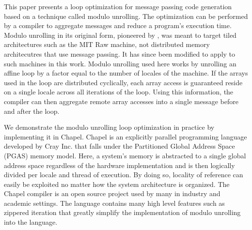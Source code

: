 This paper presents a loop optimization for message passing code generation based on a technique called modulo unrolling. The optimization can be performed by a compiler to aggregate messages and reduce a program's execution time. Modulo unrolling in its original form, pioneered by \cite{barua1999maps}, was meant to target tiled architectures such as the MIT Raw machine, not distributed memory architecutres that use message passing. It has since been modified to apply to such machines in this work. Modulo unrolling used here works by unrolling an affine loop by a factor equal to the number of locales of the machine. If the arrays used in the loop are distributed cyclically, each array access is guaranteed reside on a single locale across all iterations of the loop. Using this information, the compiler can then aggregate remote array accesses into a single message before and after the loop. 

We demonstrate the modulo unrolling loop optimization in practice by implementing it in Chapel. Chapel is an explicitly parallel programming language developed by Cray Inc. that falls under the Partitioned Global Address Space (PGAS) memory model. Here, a system's memory is abstracted to a single global address space regardless of the hardware implementation and is then logically divided per locale and thread of execution. By doing so, locality of reference can easily be exploited no matter how the system architecture is organized. The Chapel compiler is an open source project used by many in industry and academic settings. The language contains many high level features such as zippered iteration that greatly simplify the implementation of modulo unrolling into the language. 